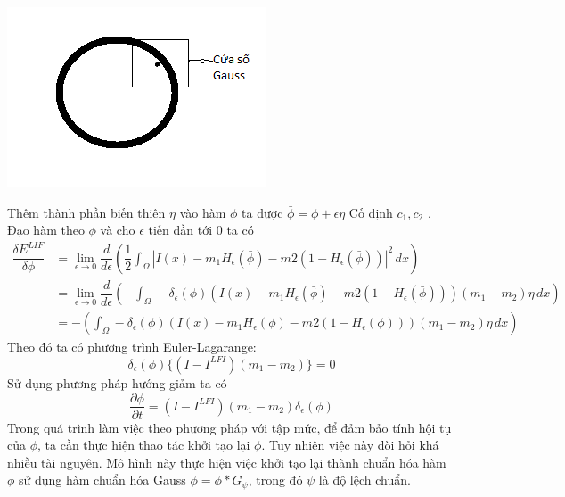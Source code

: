 \documentclass[14pt,oneside,a4paper]{extreport}
\begin{document}
\begin{center}
\includegraphics[]{figure/Gaussfilter.png}
\end{center}
Thêm thành phần biến thiên $\eta$ vào hàm $\phi$ ta được $\bar{\phi}=\phi+\epsilon \eta$
Cố định $c_1, c_2$ . Đạo hàm theo $\phi$ và cho $\epsilon$ tiến dần tới 0 ta có
\begin{equation*}
\begin{split}
\dfrac{\delta E^{LIF}}{\delta \phi } &=\lim_{\epsilon \rightarrow 0}\dfrac{d}{d \epsilon}(\dfrac{1}{2}\int_{\Omega}|I(x)-m_1H_{\epsilon}(\bar{\phi})-m2(1-H_{\epsilon}(\bar{\phi}))|^2\,dx) \\ 
&=\lim_{\epsilon \rightarrow 0}\dfrac{d}{d \epsilon}(-\int_{\Omega}-\delta_{\epsilon}(\phi)(I(x)-m_1H_{\epsilon}(\bar{\phi})-m2(1-H_{\epsilon}(\bar{\phi})))(m_1-m_2)\eta\,dx) \\ 
&=-(\int_{\Omega}-\delta_{\epsilon}(\phi)(I(x)-m_1 H_{\epsilon}(\phi)-m2(1-H_{\epsilon}(\phi)))(m_1-m_2)\eta\,dx)
\end{split}
\end{equation*}
Theo đó ta có phương trình Euler-Lagarange:
\begin{equation*}
\delta_{\epsilon}(\phi)\{(I-I^{LFI})(m_1-m_2)\}=0
\end{equation*}
Sử dụng phương pháp hướng giảm ta có
\begin{equation*}
\dfrac{\partial \phi}{\partial t}=(I-I^{LFI})(m_1-m_2)\delta_{\epsilon}(\phi)
\end{equation*}
Trong quá trình làm việc theo phương pháp với tập mức, để đảm bảo tính hội tụ của $\phi$, ta cần thực hiện thao tác khởi tạo lại $\phi$. Tuy nhiên việc này đòi hỏi khá nhiều tài nguyên. Mô hình này thực hiện việc khởi tạo lại thành chuẩn hóa hàm $\phi$ sử dụng hàm chuẩn hóa Gauss $\phi=\phi* G_{\psi}$, trong đó $\psi$ là độ lệch chuẩn.
\end{document}
